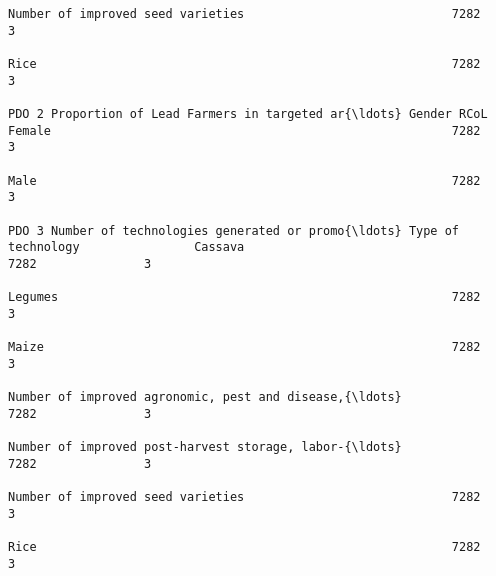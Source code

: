 \documentclass[11pt]{article}
\begin{document}
\begin{Verbatim}[commandchars=\\\{\}]
                                                                                                                                                              Number of improved seed varieties                             7282               3  
                                                                                                                                                              Rice                                                          7282               3  
                                                                         PDO 2 Proportion of Lead Farmers in targeted ar{\ldots} Gender RCoL                       Female                                                        7282               3  
                                                                                                                                                              Male                                                          7282               3  
                                                                         PDO 3 Number of technologies generated or promo{\ldots} Type of technology                Cassava                                                       7282               3  
                                                                                                                                                              Legumes                                                       7282               3  
                                                                                                                                                              Maize                                                         7282               3  
                                                                                                                                                              Number of improved agronomic, pest and disease,{\ldots}            7282               3  
                                                                                                                                                              Number of improved post-harvest storage, labor-{\ldots}            7282               3  
                                                                                                                                                              Number of improved seed varieties                             7282               3  
                                                                                                                                                              Rice                                                          7282               3  

\end{Verbatim}
\end{document}
